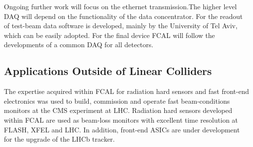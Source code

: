 Ongoing further work will focus on the ethernet transmission.The higher level DAQ will depend on the functionality of the 
data concentrator. For the readout of test-beam data software is developed, mainly by the University of Tel Aviv,
which can be easily adopted. For the final device FCAL will follow the developments of a common DAQ for all detectors.

\subsection{Applications Outside of Linear Colliders}

The expertise acquired within FCAL for radiation hard sensors and fast front-end electronics was
used to build, commission and operate fast
beam-conditions monitors at the CMS experiment at LHC.
Radiation hard sensors developed within FCAL are used as beam-loss monitors
with excellent time resolution at FLASH, XFEL and LHC.
In addition, front-end ASICs are under development for the upgrade of the LHCb tracker.
